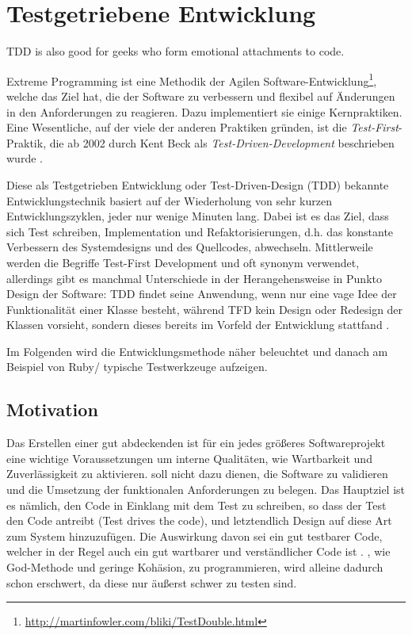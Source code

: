 \chapter{Testgetriebene Entwicklung}
\label{sec:tdd}

\epigraph{TDD is also good for geeks who form emotional attachments to code. }{\cite{beck_test_2002}}Extreme Programming ist eine Methodik der Agilen Software-Entwicklung\footnote{\url{http://martinfowler.com/bliki/TestDouble.html}}, welche das Ziel hat, die  der Software zu verbessern und flexibel auf Änderungen in den Anforderungen zu reagieren. Dazu implementiert sie einige Kernpraktiken. Eine Wesentliche, auf der viele der anderen Praktiken gründen, ist die \textit{Test-First}-Praktik, die ab 2002 durch Kent Beck als \textit{Test-Driven-Development} beschrieben wurde \citep{beck_test_2002}.

Diese als Testgetrieben Entwicklung oder Test-Driven-Design (TDD) bekannte Entwicklungstechnik basiert auf der Wiederholung von sehr kurzen Entwicklungszyklen, jeder nur wenige Minuten lang. Dabei ist es das Ziel, dass sich Test schreiben, Implementation und Refaktorisierungen, d.h. das konstante Verbessern des Systemdesigns und des Quellcodes, abwechseln. Mittlerweile werden die Begriffe Test-First Development und  oft synonym verwendet, allerdings gibt es manchmal Unterschiede in der Herangehensweise in Punkto Design der Software: TDD findet seine Anwendung, wenn nur eine vage Idee der Funktionalität einer Klasse besteht, während TFD kein Design oder Redesign der Klassen vorsieht, sondern dieses bereits im Vorfeld der Entwicklung stattfand \citep{stackoverflow_testing_2008}.


Im Folgenden wird die Entwicklungsmethode  näher beleuchtet und danach am Beispiel von Ruby/ typische Testwerkzeuge aufzeigen.




\section{Motivation}
 Das Erstellen einer gut abdeckenden  ist für ein jedes größeres Softwareprojekt eine wichtige Voraussetzungen um interne Qualitäten, wie Wartbarkeit und Zuverlässigkeit zu aktivieren.  soll nicht dazu dienen, die Software zu validieren und die Umsetzung der funktionalen Anforderungen zu belegen. Das Hauptziel ist es nämlich, den Code in Einklang mit dem Test zu schreiben, so dass der Test den Code antreibt (Test drives the code), und letztendlich Design auf diese Art zum System hinzuzufügen. Die Auswirkung davon sei ein gut testbarer Code, welcher in der Regel auch ein gut wartbarer und verständlicher Code ist \citep{beck_test_2002}. , wie God-Methode und geringe Kohäsion, zu programmieren, wird alleine dadurch schon erschwert, da diese nur äußerst schwer zu testen sind.


